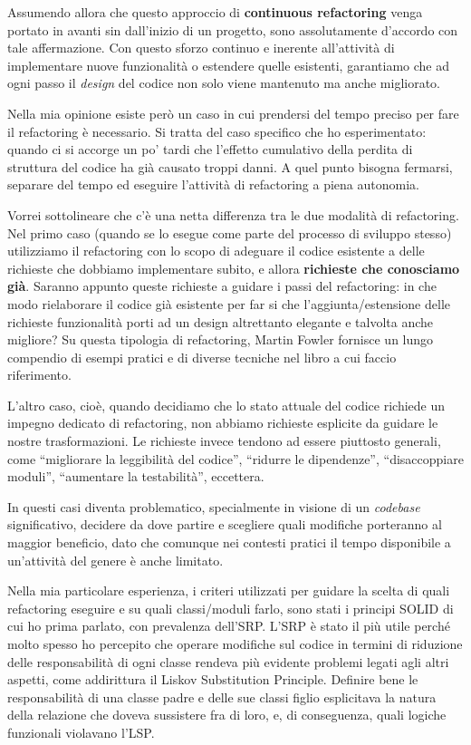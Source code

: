 \documentclass[12pt]{report}
\begin{document}
Assumendo allora che questo approccio di \textbf{continuous refactoring} venga
portato in avanti sin dall'inizio di un progetto, sono 
assolutamente d'accordo con tale affermazione. Con questo 
sforzo continuo e inerente all'attività di implementare nuove 
funzionalità o estendere quelle esistenti,
garantiamo che ad ogni passo il \textit{design} del codice non solo viene
mantenuto ma anche migliorato.

Nella mia opinione esiste però un caso in cui prendersi del tempo 
preciso per fare il refactoring è necessario. Si tratta del caso specifico che
ho esperimentato: quando ci si accorge un po' tardi che l'effetto 
cumulativo della perdita di struttura del codice ha già causato
troppi danni. A quel punto bisogna fermarsi, separare del tempo 
ed eseguire l'attività di refactoring a piena autonomia.

Vorrei sottolineare che c'è una netta differenza tra le due modalità
di refactoring. Nel primo caso (quando se lo esegue come
parte del processo di sviluppo stesso) utilizziamo il refactoring con lo
scopo di adeguare il codice esistente a delle richieste 
che dobbiamo implementare subito, e allora \textbf{richieste che conosciamo 
già}. Saranno appunto queste richieste a guidare 
i passi del refactoring: in che modo rielaborare il codice già esistente
per far si che l'aggiunta/estensione delle richieste funzionalità porti 
ad un design altrettanto elegante e talvolta anche migliore? 
Su questa tipologia di refactoring, Martin Fowler fornisce un lungo 
compendio di esempi pratici e di diverse
tecniche nel libro a cui faccio riferimento\cite{fowler2002}.

L'altro caso, cioè, quando decidiamo che lo stato attuale del codice
richiede un impegno dedicato di refactoring, non abbiamo richieste esplicite
da guidare le nostre trasformazioni. Le richieste invece tendono ad essere
piuttosto generali, come ``migliorare la leggibilità del codice'', ``ridurre
le dipendenze'', ``disaccoppiare moduli'', ``aumentare la testabilità'',
eccettera.

In questi casi diventa problematico, specialmente in visione di un
\textit{codebase} significativo, decidere da dove partire e scegliere
quali modifiche porteranno al maggior beneficio, dato che comunque
nei contesti pratici il tempo disponibile a un'attività del genere è 
anche limitato.

Nella mia particolare esperienza, i criteri utilizzati per guidare la scelta
di quali refactoring eseguire e su quali classi/moduli farlo, sono stati i
principi SOLID di cui ho prima parlato, con prevalenza dell'SRP. L'SRP è
stato il più utile perché molto spesso ho percepito che operare modifiche
sul codice in termini di riduzione delle responsabilità di ogni classe
rendeva più evidente problemi legati agli altri aspetti, come addirittura
il Liskov Substitution Principle. Definire bene le responsabilità di una classe
padre e delle sue classi figlio esplicitava la natura della relazione che
doveva sussistere fra di loro, e, di conseguenza, quali logiche funzionali
violavano l'LSP. 
\end{document}

